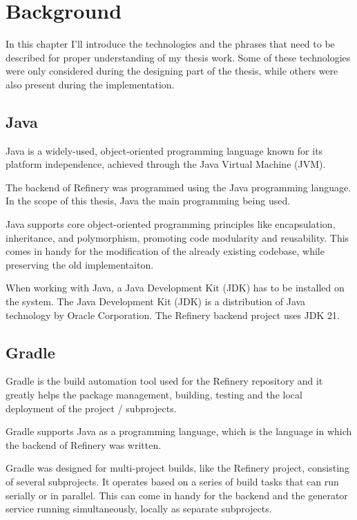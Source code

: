 \chapter{Background} \label{Background}
In this chapter I'll introduce the technologies and the phrases that need to be described for proper understanding of my thesis work.
Some of these technologies were only considered during the designing part of the thesis, while others were also present 
during the implementation.

\section{Java} \label{backgrjava}
	Java \cite{java} is a widely-used, object-oriented programming language known for its platform independence, achieved through the Java Virtual Machine (JVM). 

	The backend of Refinery was programmed using the Java programming language. In the scope of this thesis, Java the main programming being used.

	Java supports core object-oriented programming principles like encapsulation, inheritance, and polymorphism, promoting code modularity and reusability.
	This comes in handy for the modification of the already existing codebase, while preserving the old implementaiton.

	When working with Java, a Java Development Kit (JDK) has to be installed on the system.
	The Java Development Kit (JDK) is a distribution of Java technology by Oracle Corporation. 
	The Refinery backend project uses JDK 21.

\section{Gradle} \label{backgrgradle}
	Gradle \cite{gradle} is the build automation tool used for the Refinery repository and it greatly helps the package management, 
	building, testing and the local deployment of the project / subprojects.

	Gradle supports Java as a programming language, which is the language in which the backend of Refinery was written.

	Gradle was designed for multi-project builds, like the Refinery project, consisting of several subprojects. 
	It operates based on a series of build tasks that can run serially or in parallel. This can come in handy for the backend and the generator service 
	running simultaneously, locally as separate subprojects.

